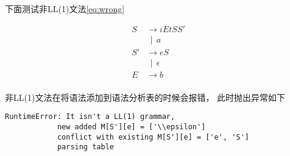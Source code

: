 \documentclass[../report]{subfiles}
\begin{document}
下面测试非LL(1)文法\ref{eq:wrong}

\begin{equation}
  \begin{array}{ll}
  	S &  \to i E t S S' \\
  		&\;\, |\;\,a \\
  	S' &  \to e S \\
  		&\;\, |\;\,\epsilon \\
  	E &  \to b \\
  \end{array}
  \label{eq:wrong}
\end{equation}

非LL(1)文法在将语法添加到语法分析表的时候会报错，
此时抛出异常如下
\begin{lstlisting}
RuntimeError: It isn't a LL(1) grammar,
            new added M[S'][e] = ['\\epsilon']
            conflict with existing M[S'][e] = ['e', 'S']
            parsing table
\end{lstlisting}
\end{document}

